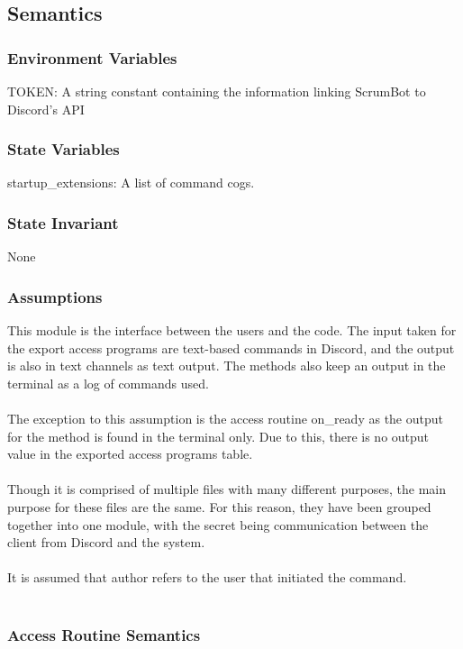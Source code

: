 \documentclass[12pt, titlepage]{article}
\begin{document}
\subsection* {Semantics}
\subsubsection* {Environment Variables}
TOKEN: A string constant containing the information linking ScrumBot to Discord's API

\subsubsection* {State Variables}
startup\_extensions: A list of command cogs.

\subsubsection* {State Invariant}
None

\subsubsection* {Assumptions}
This module is the interface between the users and the code. The input taken for the export access programs are text-based commands in Discord, and the output is also in text channels as text output. The methods also keep an output in the terminal as a log of commands used.\\ \\
The exception to this assumption is the access routine on\_ready as the output for the method is found in the terminal only. Due to this, there is no output value in the exported access programs table.\\ \\
Though it is comprised of multiple files with many different purposes, the main purpose for these files are the same. For this reason, they have been grouped together into one module, with the secret being communication between the client from Discord and the system.\\ \\
It is assumed that author refers to the user that initiated the command.\\ \\

\subsubsection* {Access Routine Semantics}
\end{document}
